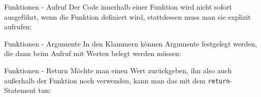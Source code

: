 \begin{frame}{Funktionen - Aufruf}
	Der Code innerhalb einer Funktion wird nicht sofort ausgeführt, wenn die Funktion definiert wird, stattdessen muss man sie explizit aufrufen:
	
\end{frame}

\begin{frame}{Funktionen - Argumente}
	In den Klammern können Argumente festgelegt werden, die dann beim Aufruf mit Werten belegt werden müssen:
	
\end{frame}

\begin{frame}{Funktionen - Return}
	Möchte man einen Wert zurückgeben, ihn also auch außerhalb der Funktion noch verwenden, kann man das mit dem \alert{\texttt{return}}-Statement tun:
	
\end{frame}

